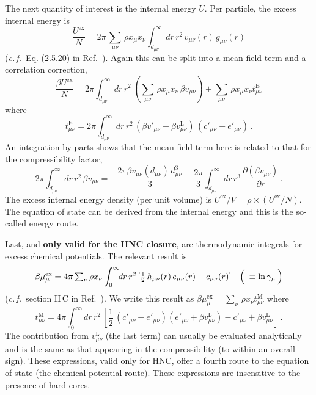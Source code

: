 \documentclass[12pt,a4paper]{article}
\newcommand{\latin}[1]{\emph{#1}}
\newcommand{\cf}{\latin{c.\,f.}}
\newcommand{\half}{{\textstyle\frac{1}{2}}}
\newcommand{\myex}{^{\mathrm{ex}}}
\newcommand{\Uex}{U\myex}
\newcommand{\muex}{\mu\myex}
\newcommand{\lr}{^{\mathrm{L}}}
\newcommand{\Refcite}[1]{Ref.~\cite{#1}}
\begin{document}
The next quantity of interest is the internal energy $U$.  Per
particle, the excess internal energy is
%
\begin{equation}
\frac{\Uex}{N}=2\pi\,{\textstyle \sum_{\mu\nu}}\,\rho x_\mu x_\nu 
\int_{d_{\mu\nu}}^\infty\!\!dr\, r^2\, v_{\mu\nu}(r)\,g_{\mu\nu}(r)
\end{equation}
%
(\cf\ Eq. (2.5.20) in \Refcite{HM06}).  Again this can be split into
a mean field term and a correlation correction,
%
\begin{equation}
\frac{\beta\Uex}{N}={2\pi}\int_{d_{\mu\nu}}^\infty\!\!dr\,r^2\,
({\textstyle \sum_{\mu\nu}}\,\rho x_\mu x_\nu\,\beta
  v_{\mu\nu})
+{\textstyle \sum_{\mu\nu}}\,
\rho x_\mu x_\nu t^{\mathrm{E}}_{\mu\nu}
\end{equation}
%
where 
%
\begin{equation}
t^{\mathrm{E}}_{\mu\nu}={2\pi}\int_{d_{\mu\nu}}^\infty\!\!dr\,r^2\,
(\beta v'_{\mu\nu}+\beta v_{\mu\nu}\lr)\,(c'_{\mu\nu}+e'_{\mu\nu})\,.
\end{equation}
%
An integration by parts shows that the mean field term here is related
to that for the compressibility factor,
%
\begin{equation}
{2\pi}\int_{d_{\mu\nu}}^\infty\!\!dr\,r^2\,
\beta v_{\mu\nu}
=
-\frac{2\pi\beta v_{\mu\nu}(d_{\mu\nu})\,d_{\mu\nu}^3}{3}
-\frac{2\pi}{3}\int_{d_{\mu\nu}}^\infty\!\!dr\,r^3\,
\frac{\partial(\beta
  v_{\mu\nu})}{\partial r}\,.\label{eq:same}
\end{equation}
%
The excess internal energy density (per unit volume) is
$\Uex/V=\rho\times (\Uex/N)$.  The equation of state can be derived
from the internal energy and this is the so-called energy route.

Last, and {\bf only valid for the HNC closure}, are thermodynamic
integrals for excess chemical potentials.
The relevant result is
%
\begin{equation}
\beta\muex_\mu = 4\pi\,{\textstyle \sum_{\nu}}\,\rho x_\nu 
\int_0^\infty\!\!dr\, r^2\, 
    [\half\,h_{\mu\nu}(r)\,e_{\mu\nu}(r)-c_{\mu\nu}(r)]\quad
    \Bigl(\>{}\equiv\ln\gamma_\mu\>\Bigr)
\end{equation}
%
(\cf\ section II\,C in \Refcite{Vrbka09}).  We
write this result as $\beta\muex_\mu = {\textstyle \sum_{\nu}}\,\rho x_\nu
t^{\mathrm{M}}_{\mu\nu}$ where
%
\begin{equation}
t^{\mathrm{M}}_{\mu\nu}=
4\pi \int_0^\infty\!\!dr\, r^2\, 
[\half\,(c'_{\mu\nu}+e'_{\mu\nu})(e'_{\mu\nu}+\beta v_{\mu\nu}\lr)
-c'_{\mu\nu}+\beta v_{\mu\nu}\lr]\,.
\end{equation}
%
The contribution from $v_{\mu\nu}\lr$ (the last term) can usually be
evaluated analytically and is the same as that appearing in the
compressibility (to within an overall sign).  These expressions, valid
only for HNC, offer a fourth route to the equation of state (the
chemical-potential route).  These expressions are insensitive to the
presence of hard cores.
\end{document}
